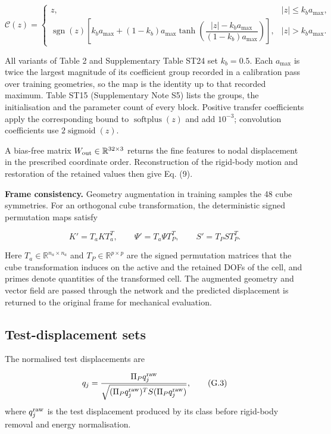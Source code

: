 \documentclass[preprint,12pt,authoryear]{elsarticle}
\begin{document}
\[
\mathcal C(z)=
\begin{cases}
z,&|z|\le k_ba_{\max},\\
\operatorname{sgn}(z)\left[k_ba_{\max}+(1-k_b)a_{\max}
\tanh\!\left(\dfrac{|z|-k_ba_{\max}}{(1-k_b)a_{\max}}\right)\right],&|z|>k_ba_{\max}.
\end{cases}
\]

All variants of Table 2 and Supplementary Table ST24 set \(k_b=0.5\). Each \(a_{\max}\) is twice the largest magnitude of its coefficient group recorded in a calibration pass over training geometries, so the map is the identity up to that recorded maximum. Table ST15 (Supplementary Note S5) lists the groups, the initialisation and the parameter count of every block. Positive transfer coefficients apply the corresponding bound to \(\operatorname{softplus}(z)\) and add \(10^{-3}\); convolution coefficients use \(2\operatorname{sigmoid}(z)\).

A bias-free matrix \(W_{\rm out}\in\mathbb R^{32\times3}\) returns the fine features to nodal displacement in the prescribed coordinate order. Reconstruction of the rigid-body motion and restoration of the retained values then give Eq. (9).

\textbf{Frame consistency.} Geometry augmentation in training samples the 48 cube symmetries. For an orthogonal cube transformation, the deterministic signed permutation maps satisfy

\[
K'=T_aKT_a^T,\qquad \Psi'=T_a\Psi T_P^T,\qquad S'=T_PST_P^T.
\tag{G.2}
\]

Here \(T_a\in\mathbb R^{n_a\times n_a}\) and \(T_P\in\mathbb R^{p\times p}\) are the signed permutation matrices that the cube transformation induces on the active and the retained DOFs of the cell, and primes denote quantities of the transformed cell. The augmented geometry and vector field are passed through the network and the predicted displacement is returned to the original frame for mechanical evaluation.

\subsection{Test-displacement sets}

The normalised test displacements are

\[
q_j=\frac{\Pi_Pq_j^{\rm raw}}
{\sqrt{(\Pi_Pq_j^{\rm raw})^TS(\Pi_Pq_j^{\rm raw})}},
\tag{G.3}
\]
where \(q_j^{\rm raw}\) is the test displacement produced by its class before rigid-body removal and energy normalisation.
\end{document}
